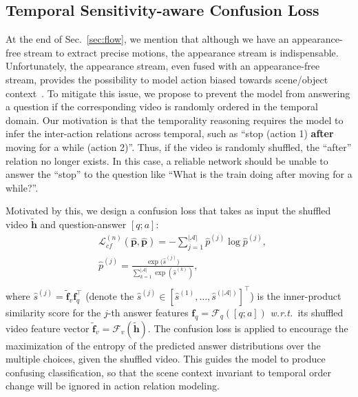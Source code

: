 \documentclass[sigconf]{acmart}
\newcommand{\wrt}{\emph{w.r.t.~}}
\begin{document}
\subsection{Temporal Sensitivity-aware Confusion Loss}
\label{sec:tsc}
At the end of Sec.~\ref{sec:flow}, we mention that although we have an appearance-free stream to extract precise motions, the appearance stream is indispensable.
Unfortunately, the appearance stream, even fused with an appearance-free stream, provides the possibility to model action biased towards scene/object context~\cite{choi2019can}.
To mitigate this issue, we propose to prevent the model from answering a question if the corresponding video is randomly ordered in the temporal domain.
Our motivation is that the temporality reasoning requires the model to infer the inter-action relations across temporal, such as ``stop (action 1) \textbf{after} moving for a while (action 2)''. Thus, if the video is randomly shuffled, the ``after'' relation no longer exists. In this case, a reliable network should be unable to answer the ``stop'' to the question like ``What is the train doing after moving for a while?''. 


Motivated by this, we design a confusion loss that takes as input the shuffled video $\tilde{\mathbf{h}}$ and question-answer $[q;a]$:
\begin{equation}
\begin{split}
    & \mathcal{L}^{(n)}_{cf} (\hat{\mathbf{p}},\hat{\mathbf{p}}) = -\sum_{j=1}^{|\mathcal{A}|}\hat{p}^{(j)}\log\hat{p}^{(j)}, \\
    & \hat{p}^{(j)} = \frac{\exp{(\hat{s}^{(j)}})}{\sum_{k=1}^{|\mathcal{A}|} \exp{(\hat{s}^{(k)})}}, \\
\end{split}
\end{equation}
where $\hat{s}^{(j)}=\tilde{\mathbf{f}}_{v} \mathbf{f}_q^\top$ (denote the $\hat{s}^{(j)} \in [\hat{s}^{(1)},\ldots,\hat{s}^{(|\mathcal{A}|)}]^\top$) is the inner-product similarity score for the $j$-th answer features $\mathbf{f}_q=\mathcal{F}_q \left ( [q; a]\right )$ \wrt its shuffled video feature vector $\tilde{\mathbf{f}}_{v}=\mathcal{F}_{v} (\mathbf{\tilde{h}})$.
The confusion loss is applied to encourage the maximization of the entropy of the predicted answer distributions over the multiple choices, given the shuffled video. This guides the model to produce confusing classification,
so that the scene context invariant to temporal order change will be ignored in action relation modeling. 
\end{document}
